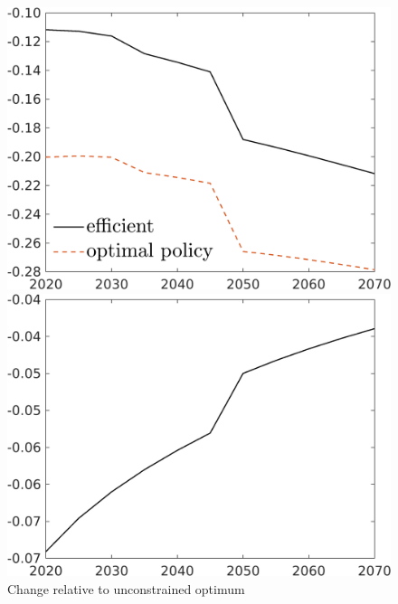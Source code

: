 \begin{figure}[h!!]
	\centering
	\caption{Change relative to unconstrained optimum }\label{fig:optAll_percEffOpt_dyn}
	
	
	\begin{minipage}[]{0.32\textwidth}
		\includegraphics[width=1\textwidth]{../../codding_model/own_basedOnFried/optimalPol_190722_tidiedUp/figures/all_Aout22/C_PercentageEffOptDyn_Target_regime3_spillover0_noskill0_sep1_xgrowth0_etaa0.79_lgd1.png}
	\end{minipage}
	\begin{minipage}[]{0.32\textwidth}
		\includegraphics[width=1\textwidth]{../../codding_model/own_basedOnFried/optimalPol_190722_tidiedUp/figures/all_Aout22/hh_PercentageOptDyn_Target_regime3_spillover0_noskill0_sep1_xgrowth0_etaa0.79_lgd0.png}

\end{minipage}
\end{figure}
